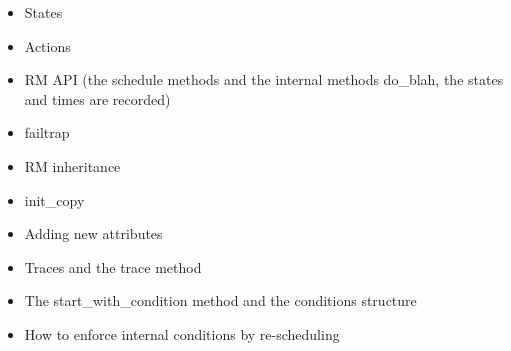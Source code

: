 %
%
%
%
%
%


\begin{itemize}
  \item States
  \item Actions
  \item RM API (the schedule methods and the internal methods do\_blah, the states and times are recorded)
  \item failtrap
  \item RM inheritance
  \item init\_copy
  \item Adding new attributes
  \item Traces and the trace method
  \item The start\_with\_condition method and the conditions structure 
  \item How to enforce internal conditions by re-scheduling
\end{itemize}

